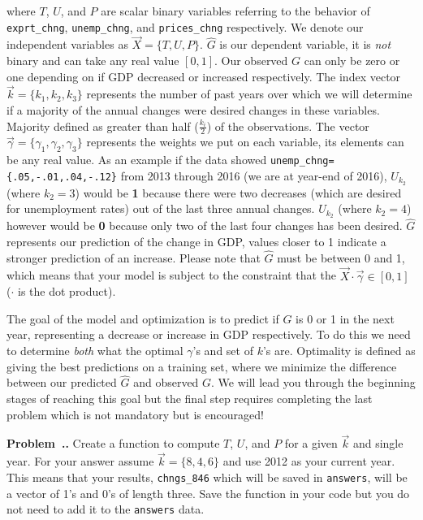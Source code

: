 \documentclass[11pt]{article}
\newcounter{prob} %
\newenvironment{prob}[1][]{\refstepcounter{prob}\par\noindent\smallskip
   \textbf{Problem~\thesection .\theprob. #1} \rmfamily}{\smallskip}
\begin{document}
where $T$, $U$, and $P$ are scalar binary variables referring to the behavior of \texttt{exprt\_chng}, \texttt{unemp\_chng}, and \texttt{prices\_chng} respectively. We denote our independent variables as $\vec{X}=\{T, U, P\}$. $\hat{G}$ is our dependent variable, it is \textit{not} binary and can take any real value $[0,1]$. Our observed $G$ can only be zero or one depending on if GDP decreased or increased respectively. The index vector $\vec{k}=\{k_1,k_2,k_3\}$ represents the number of past years over which we will determine if a majority of the annual changes were desired changes in these variables. Majority defined as greater than half ($\frac{k_i}{2}$) of the observations. The vector $\vec{\gamma}=\{\gamma_1,\gamma_2,\gamma_3\}$ represents the weights we put on each variable, its elements can be any real value. As an example if the data showed \texttt{unemp\_chng= \{.05,-.01,.04,-.12\}} from 2013 through 2016 (we are at year-end of 2016), $U_{k_2}$ (where $k_2=3$) would be \textbf{1} because there were two decreases (which are desired for unemployment rates) out of the last three annual changes. $U_{k_2}$ (where $k_2=4$) however would be \textbf{0} because only two of the last four changes has been desired. $\hat{G}$ represents our prediction of the change in GDP, values closer to 1 indicate a stronger prediction of an increase. Please note that $\hat{G}$ must be between 0 and 1, which means that your model is subject to the constraint that the $\vec{X} \cdot \vec{\gamma} \in [0,1]$ ($\cdot$ is the dot product).
\par
The goal of the model and optimization is to predict if $G$ is 0 or 1 in the next year, representing a decrease or increase in GDP respectively. To do this we need to determine \textit{both} what the optimal $\gamma$'s and set of $k$'s are. Optimality is defined as giving the best predictions on a training set, where we minimize the difference between our predicted $\hat{G}$ and observed $G$. We will lead you through the beginning stages of reaching this goal but the final step requires completing the last problem which is not mandatory but is encouraged!
\newline
\begin{prob}
Create a function to compute $T$, $U$, and $P$ for a given $\vec{k}$ and single year. For your answer assume $\vec{k}=\{8,4,6\}$ and use 2012 as your current year. This means that your results, \texttt{chngs\_846} which will be saved in \texttt{answers}, will be a vector of 1's and 0's of length three. Save the function in your code but you do not need to add it to the \texttt{answers} data.
\end{prob}
\end{document}
